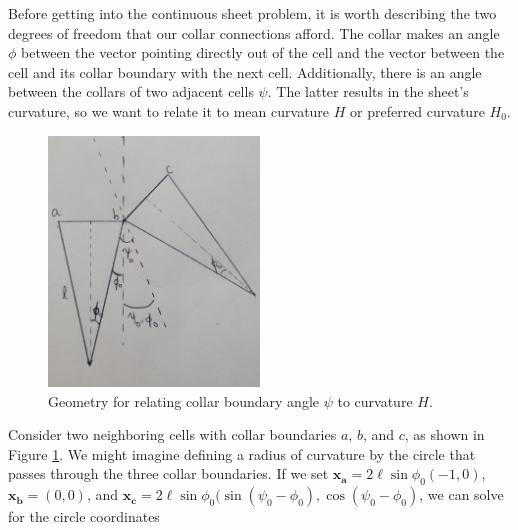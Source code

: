 
Before getting into the continuous sheet problem, it is worth describing the two degrees of freedom that our collar connections afford. 
The collar makes an angle $\phi$ between the vector pointing directly out of the cell and the vector between the cell and its collar boundary with the next cell. 
Additionally, there is an angle between the collars of two adjacent cells $\psi$. The latter results in the sheet's curvature, so we want to relate it to mean curvature $H$ or preferred curvature $H_0$. 


\begin{figure}[htbp]
    \centering
    \includegraphics[width=0.5\textwidth]{hpsi.jpg}
    \caption[Geometry of sheet curvature]{Geometry for relating collar boundary angle $\psi$ to curvature $H$. }
    \label{fig:hpsi}
\end{figure}

Consider two neighboring cells with collar boundaries $a$, $b$, and $c$, as shown in Figure \ref{fig:hpsi}. We might imagine defining a radius of curvature by the circle that passes through the three collar boundaries. If we set $\bm{x_a} = 2\ell\sin\phi_0(-1, 0)$, $\bm{x_b} = (0,0)$, and $\bm{x_c} = 2\ell\sin\phi_0 (\sin(\psi_0 - \phi_0), \cos(\psi_0-\phi_0)$, we can solve for the circle coordinates 


